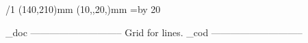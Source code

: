 \fontfam[arno]
\typosize[11/22]

\margins/1 (140,210)mm (10,,20,)mm
\hsize=120mm\relax
\vsize=\topskip \advance\vsize by 20\baselineskip\relax

\footlinedist=40pt

\parindent=0pt\relax

\newtoks\linetocenter

\def\startpoem{%
	\vfil\break
	\bgroup
	\obeylines
	\leftskip0pt \rightskip=\leftskip
	\smash{\centerline{\font\debgaramond "EBGaramond12-Regular" at 12pt\debgaramond \char"2766\relax}}
	\vskip\baselineskip
	\setbox0=\hbox{\the\linetocenter}\relax
	\leftskip=\dimexpr(\hsize-\wd0)/2\relax
}

\def\stoppoem{%
	\leftskip=0mm
	\egroup\par
}


    \_doc -----------------------------
    Grid for lines.
    \_cod -----------------------------

